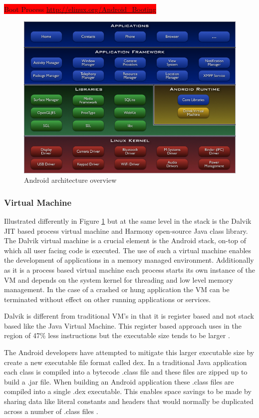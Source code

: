 \colorbox{red}{Boot Process \url{http://elinux.org/Android_Booting}}

\begin{figure}[h!]
\centering
    \includegraphics[width=1\textwidth]{research/images/android_arch.png}
    \caption{Android architecture overview}%
    \label{android_arch}
\end{figure}

\subsubsection{Virtual Machine}
Illustrated differently in Figure \ref{android_arch} but at the same level in the stack is the Dalvik JIT based process virtual machine and Harmony open-source Java class library. The Dalvik virtual machine is a crucial element is the Android stack, on-top of which all user facing code is executed.  The use of such a virtual machine enables the development of applications in a memory managed environment. Additionally as it is a process based virtual machine each process starts its own instance of the VM and depends on the system kernel for threading and low level memory management. In the case of a crashed or hung application the VM can be terminated without effect on other running applications or services.

Dalvik is different from traditional VM’s in that it is register based and not stack based like the Java Virtual Machine. This register based approach uses in the region of 47\% less instructions but the executable size tends to be larger \cite{ehringerdalvik10}.

The Android developers have attempted to mitigate this larger executable size by create a new executable file format called dex. In a traditional Java application each class is compiled into a bytecode .class file and these files are zipped up to build a .jar file. When building an Android application these .class files are compiled into a single .dex executable. This enables space savings to be made by sharing data like literal constants and headers that would normally be duplicated across a number of .class files \cite{ehringerdalvik10}.

